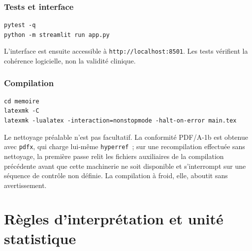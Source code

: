 \subsubsection{Tests et interface}
\begin{verbatim}
pytest -q
python -m streamlit run app.py
\end{verbatim}

L'interface est ensuite accessible à \texttt{http://localhost:8501}. Les tests vérifient la
cohérence logicielle, non la validité clinique.

\subsubsection{Compilation}
\begin{verbatim}
cd memoire
latexmk -C
latexmk -lualatex -interaction=nonstopmode -halt-on-error main.tex
\end{verbatim}

Le nettoyage préalable n'est pas facultatif. La conformité PDF/A-1b est obtenue avec
\texttt{pdfx}, qui charge lui-même \texttt{hyperref}~; sur une recompilation effectuée sans
nettoyage, la première passe relit les fichiers auxiliaires de la compilation précédente avant
que cette machinerie ne soit disponible et s'interrompt sur une séquence de contrôle non
définie. La compilation à froid, elle, aboutit sans avertissement.

\section{Règles d'interprétation et unité statistique}
